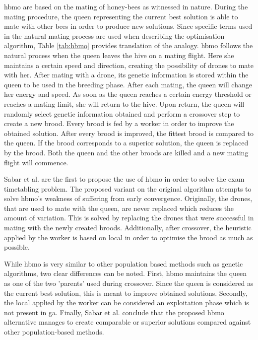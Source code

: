 \acrfull{hbmo} \cite{abbas2001} are based on the mating of honey-bees as witnessed in nature. During the mating procedure, the queen representing the current best solution is able to mate with other bees in order to produce new solutions. Since specific terms used in the natural mating process are used when describing the optimisation algorithm, Table \ref{tab:hbmo} provides translation of the analogy. \acrshort{hbmo} follows the natural process when the queen leaves the hive on a mating flight. Here she maintains a certain speed and direction, creating the possibility of drones to mate with her. After mating with a drone, its genetic information is stored within the queen to be used in the breeding phase. After each mating, the queen will change her energy and speed. As soon as the queen reaches a certain energy threshold or reaches a mating limit, she will return to the hive. Upon return, the queen will randomly select genetic information obtained and perform a crossover step to create a new brood. Every brood is fed by a worker in order to improve the obtained solution. After every brood is improved, the fittest brood is compared to the queen. If the brood corresponds to a superior solution, the queen is replaced by the brood. Both the queen and the other broods are killed and a new mating flight will commence. 

Sabar et al. \cite{Sabar2009} are the first to propose the use of \acrlong{hbmo} in order to solve the exam timetabling problem. The proposed variant on the original algorithm \cite{abbas2001} attempts to solve \acrshort{hbmo}'s weakness of suffering from early convergence. Originally, the drones, that are used to mate with the queen, are never replaced which reduces the amount of variation. This is solved by replacing the drones that were successful in mating with the newly created broods. Additionally, after crossover, the heuristic applied by the worker is based on \acrlong{local} in order to optimise the brood as much as possible.

While \acrshort{hbmo} is very similar to other population based methods such as genetic algorithms, two clear differences can be noted. First, \acrshort{hbmo} maintains the queen as one of the two 'parents' used during crossover. Since the queen is considered as the current best solution, this is meant to improve obtained solutions. Secondly, the \acrlong{local} applied by the worker can be considered an exploitation phase which is not present in \acrlong{ga}. Finally, Sabar et al. conclude that the proposed \acrshort{hbmo} alternative manages to create comparable or superior solutions compared against other population-based methods.

